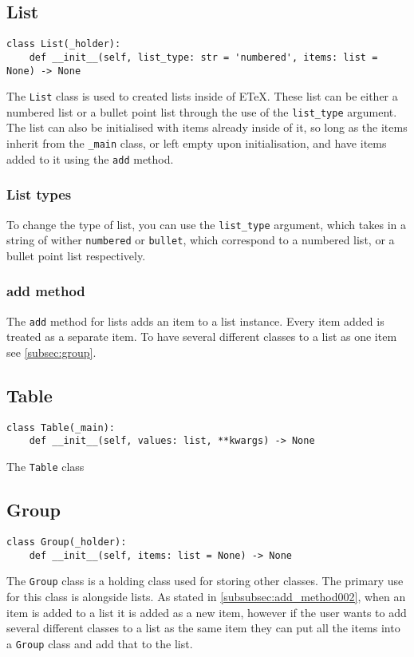 \documentclass{article}
\begin{document}
\subsection{List}\label{subsec:list}
\begin{verbatim}
class List(_holder):
	def __init__(self, list_type: str = 'numbered', items: list = None) -> None
\end{verbatim}
The \verb|List| class is used to created lists inside of ETeX. These list can be either a numbered list or a bullet point list through the use of the \verb|list_type| argument. The list can also be initialised with items already inside of it, so long as the items inherit from the \verb|_main| class, or left empty upon initialisation, and have items added to it using the \verb|add| method.
\subsubsection{List types}\label{subsubsec:list_types}
To change the type of list, you can use the \verb|list_type| argument, which takes in a string of wither \verb|numbered| or \verb|bullet|, which correspond to a numbered list, or a bullet point list respectively.
\subsubsection{add method}\label{subsubsec:add_method002}
The \verb|add| method for lists adds an item to a list instance. Every item added is treated as a separate item. To have several different classes to a list as one item see \autoref{subsec:group}.
\subsection{Table}\label{subsec:table}
\begin{verbatim}
class Table(_main):
	def __init__(self, values: list, **kwargs) -> None
\end{verbatim}
The \verb|Table| class 
\subsection{Group}\label{subsec:group}
\begin{verbatim}
class Group(_holder):
	def __init__(self, items: list = None) -> None
\end{verbatim}
The \verb|Group| class is a holding class used for storing other classes. The primary use for this class is alongside lists. As stated in \autoref{subsubsec:add_method002}, when an item is added to a list it is added as a new item, however if the user wants to add several different classes to a list as the same item they can put all the items into a \verb|Group| class and add that to the list.
\end{document}
